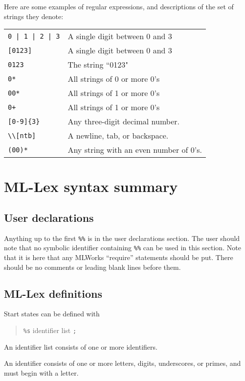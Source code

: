 \documentclass{article}
\begin{document}
Here are some examples of regular expressions, and descriptions of the
set of strings they denote:

\begin{tabular}{ll}
\verb~0 | 1 | 2 | 3~&           A single digit between 0 and 3\\
\verb|[0123]|&			A single digit between 0 and 3\\
\verb|0123|&                    The string ``0123"\\
\verb|0*|&                      All strings of 0 or more 0's\\
\verb|00*|&                     All strings of 1  or more 0's\\
\verb|0+|&                      All strings of 1  or more 0's\\
\verb|[0-9]{3}|&		Any three-digit decimal number.\\
\verb|\\[ntb]|&			A newline, tab, or backspace.\\
\verb|(00)*|& Any string with an even number of 0's.
\end{tabular}

\section{ML-Lex syntax summary}

\subsection{User declarations}

Anything up to the first \verb|%%| is in the user declarations section.  The
user should note that no symbolic identifier containing 
\verb|%%| can be
used in this section.  Note that it is here that any MLWorks ``require''
statements should be put.  There should be no comments or leading
blank lines before them.


\subsection{ML-Lex definitions}

Start states can be defined with
\begin{quote}
\verb|%s| {identifier list} \verb|;|
\end{quote}

An identifier list consists of one or more identifiers.

An identifier consists of one or more letters, digits, underscores,
or primes, and must begin with a letter.
\end{document}
